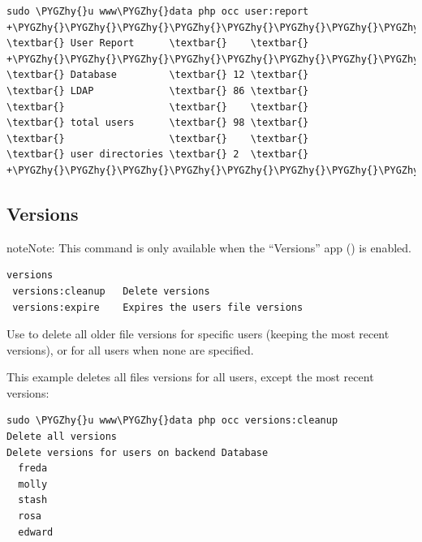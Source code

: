 \documentclass[letterpaper,10pt,english]{sphinxmanual}
\def\PYGZhy{\char`\-}
\begin{document}
\begin{Verbatim}[commandchars=\\\{\}]
sudo \PYGZhy{}u www\PYGZhy{}data php occ user:report
+\PYGZhy{}\PYGZhy{}\PYGZhy{}\PYGZhy{}\PYGZhy{}\PYGZhy{}\PYGZhy{}\PYGZhy{}\PYGZhy{}\PYGZhy{}\PYGZhy{}\PYGZhy{}\PYGZhy{}\PYGZhy{}\PYGZhy{}\PYGZhy{}\PYGZhy{}\PYGZhy{}+\PYGZhy{}\PYGZhy{}\PYGZhy{}\PYGZhy{}+
\textbar{} User Report      \textbar{}    \textbar{}
+\PYGZhy{}\PYGZhy{}\PYGZhy{}\PYGZhy{}\PYGZhy{}\PYGZhy{}\PYGZhy{}\PYGZhy{}\PYGZhy{}\PYGZhy{}\PYGZhy{}\PYGZhy{}\PYGZhy{}\PYGZhy{}\PYGZhy{}\PYGZhy{}\PYGZhy{}\PYGZhy{}+\PYGZhy{}\PYGZhy{}\PYGZhy{}\PYGZhy{}+
\textbar{} Database         \textbar{} 12 \textbar{}
\textbar{} LDAP             \textbar{} 86 \textbar{}
\textbar{}                  \textbar{}    \textbar{}
\textbar{} total users      \textbar{} 98 \textbar{}
\textbar{}                  \textbar{}    \textbar{}
\textbar{} user directories \textbar{} 2  \textbar{}
+\PYGZhy{}\PYGZhy{}\PYGZhy{}\PYGZhy{}\PYGZhy{}\PYGZhy{}\PYGZhy{}\PYGZhy{}\PYGZhy{}\PYGZhy{}\PYGZhy{}\PYGZhy{}\PYGZhy{}\PYGZhy{}\PYGZhy{}\PYGZhy{}\PYGZhy{}\PYGZhy{}+\PYGZhy{}\PYGZhy{}\PYGZhy{}\PYGZhy{}+
\end{Verbatim}


\subsection{Versions}
\label{configuration_server/occ_command:versions-label}\label{configuration_server/occ_command:versions}
\begin{notice}{note}{Note:}
This command is only available when the ``Versions'' app () is
enabled.
\end{notice}

\begin{Verbatim}[commandchars=\\\{\}]
versions
 versions:cleanup   Delete versions
 versions:expire    Expires the users file versions
\end{Verbatim}

Use  to delete all older file versions for specific users (keeping the most recent versions), or for all users when none are specified.

This example deletes all files versions for all users, except the most recent versions:

\begin{Verbatim}[commandchars=\\\{\}]
sudo \PYGZhy{}u www\PYGZhy{}data php occ versions:cleanup
Delete all versions
Delete versions for users on backend Database
  freda
  molly
  stash
  rosa
  edward
\end{Verbatim}
\end{document}
